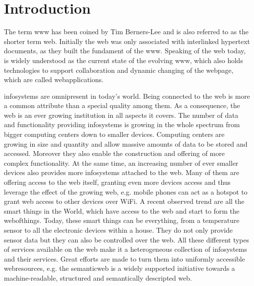 
\chapter{Introduction}
The term \textrm{\gls{www}} has been coined by Tim Berners-Lee\cite{DBLP:journals/en/Berners-LeeCGP92} and is also referred to as the shorter term \textrm{\gls{web}}.
Initially the \textrm{\gls{web}} was only associated with interlinked hypertext documents, as they built the fundament of the \textrm{\gls{www}}.
Speaking of the \textrm{\gls{web}} today, is widely understood as the current state of the evolving \textrm{\gls{www}}, which also holds technologies to support collaboration and dynamic changing of the webpage, which are called \textrm{\glspl{webapplication}}.

\textrm{\glspl{infosystem}} are omnipresent in today's world.
Being connected to the \textrm{\gls{web}} is more a common attribute than a special quality among them.
As a consequence, the \textrm{\gls{web}} is an ever growing institution in all aspects it covers.
The number of data and functionality providing \textrm{\glspl{infosystem}} is growing in the whole spectrum from bigger computing centers down to smaller devices.
Computing centers are growing in size and quantity and allow massive amounts of data to be stored and accessed.
Moreover they also enable the construction and offering of more complex functionality.
At the same time, an increasing number of ever smaller devices also provides more \textrm{\glspl{infosystem}} attached to the \textrm{\gls{web}}.
Many of them are offering access to the \textrm{\gls{web}} itself, granting even more devices access and thus leverage the effect of the growing \textrm{\gls{web}}, e.g. mobile phones can act as a hotspot to grant \textrm{\gls{web}} access to other devices over \textrm{WiFi}.
A recent observed trend are all the smart things in the World, which have access to the \textrm{\gls{web}} and start to form the \textrm{\gls{webofthings}}.
Today, these smart things can be everything, from a temperature sensor to all the electronic devices within a house.
They do not only provide sensor data but they can also be controlled over the \textrm{\gls{web}}.
All these different types of services available on the \textrm{\gls{web}} make it a heterogeneous collection of \textrm{\glspl{infosystem}} and their services.
Great efforts are made to turn them into uniformly accessible \textrm{\glspl{webresource}}, e.g. the \textrm{\gls{semanticweb}} is a widely supported initiative towards a machine-readable, structured and semantically descripted \textrm{\gls{web}}.

